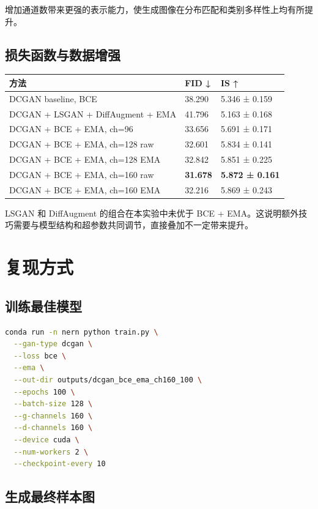 \documentclass[UTF8,a4paper,12pt]{ctexart}
\begin{document}
增加通道数带来更强的表示能力，使生成图像在分布匹配和类别多样性上均有所提升。


\subsection{损失函数与数据增强}

\begin{table}[H]
\centering
\small
\begin{tabularx}{\linewidth}{lXX}
\toprule
方法 & FID ↓ & IS ↑ \\
\midrule
DCGAN baseline, BCE & 38.290 & 5.346 ± 0.159 \\
DCGAN + LSGAN + DiffAugment + EMA & 41.796 & 5.163 ± 0.168 \\
DCGAN + BCE + EMA, ch=96 & 33.656 & 5.691 ± 0.171 \\
DCGAN + BCE + EMA, ch=128 raw & 32.601 & 5.834 ± 0.141 \\
DCGAN + BCE + EMA, ch=128 EMA & 32.842 & 5.851 ± 0.225 \\
DCGAN + BCE + EMA, ch=160 raw & \textbf{31.678} & \textbf{5.872 ± 0.161} \\
DCGAN + BCE + EMA, ch=160 EMA & 32.216 & 5.869 ± 0.243 \\
\bottomrule
\end{tabularx}
\end{table}


LSGAN 和 DiffAugment 的组合在本实验中未优于 BCE + EMA。这说明额外技巧需要与模型结构和超参数共同调节，直接叠加不一定带来提升。


\section{复现方式}

\subsection{训练最佳模型}

\begin{lstlisting}[language=bash]
conda run -n nern python train.py \
  --gan-type dcgan \
  --loss bce \
  --ema \
  --out-dir outputs/dcgan_bce_ema_ch160_100 \
  --epochs 100 \
  --batch-size 128 \
  --g-channels 160 \
  --d-channels 160 \
  --device cuda \
  --num-workers 2 \
  --checkpoint-every 10
\end{lstlisting}


\subsection{生成最终样本图}
\end{document}
